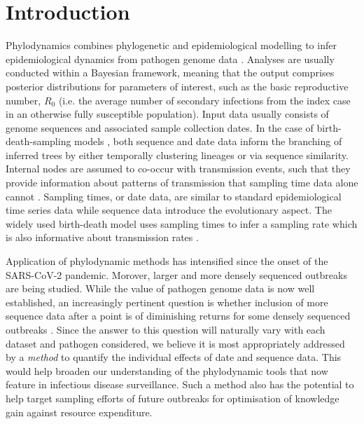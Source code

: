 \documentclass{article}
\begin{document}
\section*{Introduction}
Phylodynamics combines phylogenetic and epidemiological modelling to infer epidemiological dynamics from pathogen genome data \citep{du2015getting,baele2018recent,volz2013viral}. Analyses are usually conducted within a Bayesian framework, meaning that the output comprises posterior distributions for parameters of interest, such as the basic reproductive number, $R_{0}$ (i.e. the average number of secondary infections from the index case in an otherwise fully susceptible population). Input data usually consists of genome sequences and associated sample collection dates. In the case of birth-death-sampling models \citep{stadler_sampling-through-time_2010}, both sequence and date data inform the branching of inferred trees by either temporally clustering lineages or via sequence similarity.  Internal nodes are assumed to co-occur with transmission events, such that they provide information about patterns of transmission that sampling time data alone cannot \citep{featherstone_epidemiological_2022}. Sampling times, or date data, are similar to standard epidemiological time series data while sequence data introduce the evolutionary aspect. The widely used birth-death model uses sampling times to infer a sampling rate which is also informative about transmission rates \citep{boskova2018influence,stadler2012estimating}. 

Application of phylodynamic methods has intensified since the onset of the SARS-CoV-2 pandemic. Morover, larger and more densely sequenced outbreaks are being studied. While the value of pathogen genome data is now well established, an increasingly pertinent question is whether inclusion of more sequence data after a point is of diminishing returns for some densely sequenced outbreaks \citep{porter2022new, hill2021progress}. Since the answer to this question will  naturally vary with each dataset and pathogen considered, we believe it is most appropriately addressed by a \emph{method} to quantify the individual effects of date and sequence data. This would help broaden our understanding of the phylodynamic tools that now feature in infectious disease surveillance. Such a method also has the potential to help target sampling efforts of future outbreaks for optimisation of knowledge gain against resource expenditure. 
\end{document}
